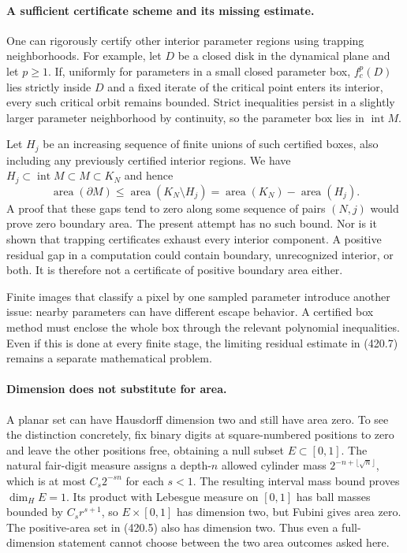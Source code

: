 \documentclass[11pt]{article}
\begin{document}
\paragraph{A sufficient certificate scheme and its missing estimate.}
One can rigorously certify other interior parameter regions using trapping neighborhoods. For example, let $D$ be a closed disk in the dynamical plane and let $p\ge1$. If, uniformly for parameters in a small closed parameter box, $f_c^p(D)$ lies strictly inside $D$ and a fixed iterate of the critical point enters its interior, every such critical orbit remains bounded. Strict inequalities persist in a slightly larger parameter neighborhood by continuity, so the parameter box lies in $\operatorname{int}M$.

Let $H_j$ be an increasing sequence of finite unions of such certified boxes, also including any previously certified interior regions. We have $H_j\subset\operatorname{int}M\subset M\subset K_N$ and hence
\[
 \operatorname{area}(\partial M)
 \le\operatorname{area}(K_N\setminus H_j)
 =\operatorname{area}(K_N)-\operatorname{area}(H_j).
 \tag{420.7}
\]
A proof that these gaps tend to zero along some sequence of pairs $(N,j)$ would prove zero boundary area. The present attempt has no such bound. Nor is it shown that trapping certificates exhaust every interior component. A positive residual gap in a computation could contain boundary, unrecognized interior, or both. It is therefore not a certificate of positive boundary area either.

Finite images that classify a pixel by one sampled parameter introduce another issue: nearby parameters can have different escape behavior. A certified box method must enclose the whole box through the relevant polynomial inequalities. Even if this is done at every finite stage, the limiting residual estimate in (420.7) remains a separate mathematical problem.

\paragraph{Dimension does not substitute for area.}
A planar set can have Hausdorff dimension two and still have area zero. To see the distinction concretely, fix binary digits at square-numbered positions to zero and leave the other positions free, obtaining a null subset $E\subset[0,1]$. The natural fair-digit measure assigns a depth-$n$ allowed cylinder mass $2^{-n+\lfloor\sqrt n\rfloor}$, which is at most $C_s2^{-sn}$ for each $s<1$. The resulting interval mass bound proves $\dim_H E=1$. Its product with Lebesgue measure on $[0,1]$ has ball masses bounded by $C_sr^{s+1}$, so $E\times[0,1]$ has dimension two, but Fubini gives area zero. The positive-area set in (420.5) also has dimension two. Thus even a full-dimension statement cannot choose between the two area outcomes asked here.
\end{document}

